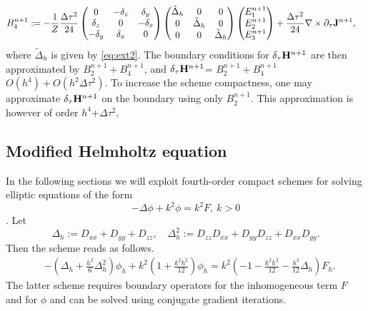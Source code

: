\documentclass[12pt,reqno]{amsart}
\newcommand{\h}{{\bf H}}
\newcommand{\J}{{\bf J}}
\theoremstyle{definition}
\numberwithin{equation}{section}
\begin{document}
	\begin{align*}
		&
		B_4^{n+1}:=
		-\frac{1}{Z}\frac{\Delta \tau^2}{24}
		\begin{pmatrix}
			0& -\delta_z & \delta _y\\
			\delta_z&0&-\delta_x\\
			-\delta_y&\delta_x&0\\
		\end{pmatrix}
		\begin{pmatrix}
			\tilde{\Delta}_h& 0 & 0\\
			0	&\tilde{\Delta}_h&0\\
			0&0&\tilde{\Delta}_h\\
		\end{pmatrix}
		\begin{pmatrix}
			E_1^{n+1}\\
			E_2^{n+1}\\
			E_3^{n+1}
		\end{pmatrix}
		+\frac{\Delta \tau^2}{24}\nabla \times \partial_{\tau}\J^{n+1},
	\end{align*}
	where $\tilde{\Delta}_h$ is given by \eqref{eq:ext2}.
	The boundary conditions for $\delta_{\tau}\h^{n+1}$ are then approximated by $B_2^{n+1}+B_4^{n+1}$, and 
	$\delta_{\tau}\h^{n+1}$=
          	 $B_2^{n+1}+B_4^{n+1}$
	$O(h^4)+O(h^2\Delta \tau^2)$.
	To increase the scheme compactness, one may approximate $\delta_{\tau}\h^{n+1}$ on the boundary using only 
$	B_2^{n+1}$. This approximation is however of order $h^4$+$\Delta \tau^2$.
	   \subsection{Modified Helmholtz equation}\label{subsec:mh}
	In the following sections we will exploit fourth-order compact schemes for solving elliptic equations of the form $$-\Delta \phi+k^2\phi=k^2F, \ k>0$$ \cite{singer_turkel}.
	Let 
	$$
	\Delta_h:=D_{xx}+D_{yy}+D_{zz}, \quad \Delta^2_h:= D_{zz}D_{xx}+D_{yy}D_{zz}+D_{xx}D_{yy}.
	$$
	Then the scheme reads as follows.
	\begin{align*}
		&
		-\left (
		\Delta_h+\frac{h^2}{6}\Delta^2_h
		\right)\phi_h+
		k^2\left (
		1+\frac{k^2h^2}{12}
		\right)\phi_h=
		k^2\left (
		-1-\frac{k^2h^2}{12}
		-\frac{h^2}{12}\Delta_h
		\right)F_h.
	\end{align*}
	The latter scheme requires boundary operators for the inhomogeneous term $F$ and for $\phi$ and can be solved using conjugate gradient iterations.
	
\end{document}
